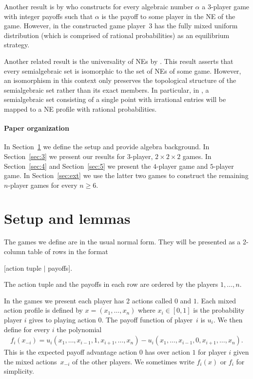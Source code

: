 \documentclass[preprint,12pt,authoryear]{elsarticle}
\begin{document}
Another result is by \citet{bubelis1979equilibria} who constructs for every algebraic 
number $\alpha$ a $3$-player game with integer payoffs such that $\alpha$ is the payoff to 
some player in the NE of the game. However, in the constructed game player~$3$ has the fully mixed 
uniform distribution (which is comprised of rational probabilities) as an equilibrium 
strategy.

Another related result is the universality of NEs by \citet{datta2003universality}. This 
result asserts that every semialgebraic set is isomorphic to the set of NEs of some game.  
However, an isomorphism in this context only 
preserves the topological structure of the semialgebraic set rather than its exact members.  
In particular, in \citet{datta2003universality}, a semialgebraic set consisting of a single 
point with irrational entries will be mapped to a NE profile with rational probabilities.

\paragraph{Paper organization} In Section~\ref{sec:defs} we define the setup and provide 
algebra background. In Section~\ref{sec:3} we present our results for $3$-player, 
$2\times2\times2$ games. In Section~\ref{sec:4} and Section~\ref{sec:5} we present the 
$4$-player game and $5$-player game. In Section~\ref{sec:ext} we use the latter two games 
to construct the remaining $n$-player games for every $n\ge6$.



\section{Setup and lemmas}\label{sec:defs}

The games we define are in the usual normal form.
They will be presented as a 2-column table of rows in the format
\begin{center}
  [action tuple $|$ payoffs].
\end{center}
The action tuple and the payoffs in each row are ordered by the players $1,\ldots,n$.

In the games we present each player has 2 actions called $0$ and $1$. Each mixed action 
profile is defined by $x=(x_1,\ldots,x_n)$ where $x_i\in[0,1]$ is the probability player $i$ 
gives to playing action 0. The payoff function of player~$i$ is $u_i$. We then define for 
every $i$ the polynomial
\begin{align}\label{eq:polys}
  f_i(x_{-i})=u_i(x_1,\dots,x_{i-1},1,x_{i+1},\ldots,x_n)-u_i(x_1,\ldots,x_{i-1},0,x_{i+1},\ldots,x_n).
\end{align}
This is the expected payoff advantage action $0$ has over action $1$ for player $i$ given 
the mixed actions~$x_{-i}$ of the other players. We sometimes write $f_i(x)$ or $f_i$ for 
simplicity.
\end{document}
